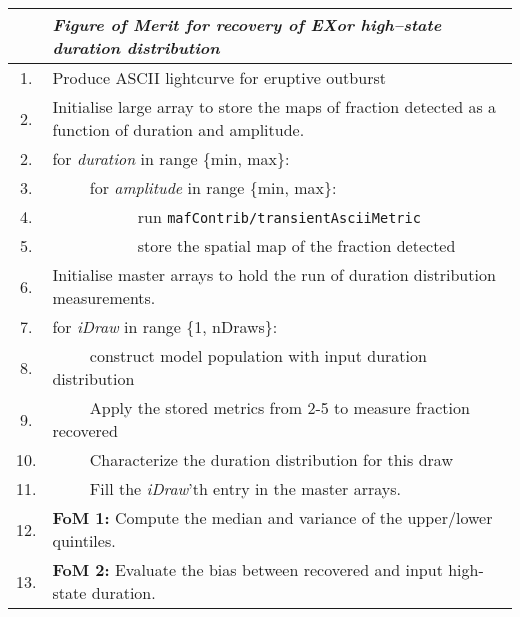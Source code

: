 
\begin{table}
\small
\begin{tabular}{c p{12cm}}
& {\it Figure of Merit for recovery of EXor high--state duration distribution}\\
\hline
1.  & Produce ASCII lightcurve for eruptive outburst \\
2.  & Initialise large array to store the maps of fraction detected as a function of duration and amplitude. \\
2.  & for {\it duration} in range \{min, max\}:  \\
3.  & ~~~~ for {\it amplitude} in range \{min, max\}: \\
4.  & ~~~~~~~~~~ run {\tt mafContrib/transientAsciiMetric} \\
5.  & ~~~~~~~~~~ store the spatial map of the fraction detected \\
6.  & Initialise master arrays to hold the run of duration distribution measurements.\\
7.  & for {\it iDraw} in range \{1, nDraws\}:\\
8.  & ~~~~ construct model population with input duration distribution \\
9.  & ~~~~ Apply the stored metrics from 2-5 to measure fraction recovered \\
10.  & ~~~~ Characterize the duration distribution for this draw \\
11. & ~~~~ Fill the {\it iDraw}'th entry in the master arrays. \\
12. & {\bf FoM 1:} Compute the median and variance of the upper/lower quintiles. \\
13. & {\bf FoM 2:} Evaluate the bias between recovered and input high-state duration. \\
\hline
\end{tabular}
\caption{}
\label{table:pseudoForExor}
\end{table}




